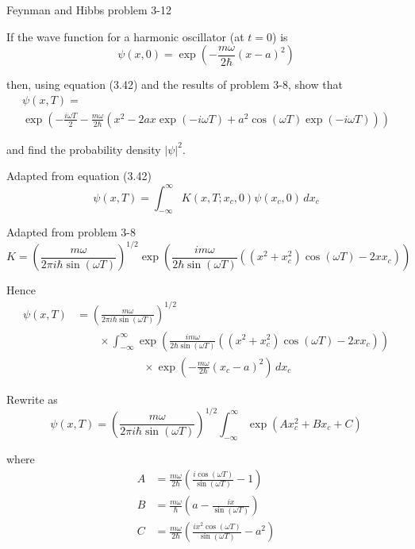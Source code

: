 \documentclass[12pt]{article}
\begin{document}
Feynman and Hibbs problem 3-12

\bigskip
If the wave function for a harmonic oscillator (at $t=0$) is
\begin{equation*}
\psi(x,0)=\exp\left(-\frac{m\omega}{2\hbar}(x-a)^2\right)
\end{equation*}

then, using equation (3.42) and the results of problem 3-8, show that
\begin{multline*}
\psi(x,T)=
\\
\exp\left(
-\frac{i\omega T}{2}-\frac{m\omega}{2\hbar}
\left(x^2-2ax\exp(-i\omega T)+a^2\cos(\omega T)\exp(-i\omega T)\right)
\right)
\end{multline*}

and find the probability density $|\psi|^2$.

\bigskip
Adapted from equation (3.42)
\begin{equation*}
\psi(x,T)=\int_{-\infty}^\infty K(x,T;x_c,0)\psi(x_c,0)\,dx_c
\end{equation*}

Adapted from problem 3-8
\begin{equation*}
K=\left(\frac{m\omega}{2\pi i\hbar\sin(\omega T)}\right)^{1/2}
\exp\left(
\frac{im\omega}{2\hbar\sin(\omega T)}\left((x^2+x_c^2)\cos(\omega T)-2xx_c\right)
\right)
\end{equation*}

Hence
\begin{align*}
\psi(x,T)&=\left(\frac{m\omega}{2\pi i\hbar\sin(\omega T)}\right)^{1/2}
\\
&\qquad{}\times
\int_{-\infty}^\infty \exp\left(
\frac{im\omega}{2\hbar\sin(\omega T)}\left((x^2+x_c^2)\cos(\omega T)-2xx_c\right)
\right)
\\
&\qquad\qquad\qquad{}\times
\exp\left(-\frac{m\omega}{2\hbar}(x_c-a)^2\right)\,dx_c
\end{align*}

Rewrite as
\begin{equation*}
\psi(x,T)=\left(\frac{m\omega}{2\pi i\hbar\sin(\omega T)}\right)^{1/2}
\int_{-\infty}^\infty\exp(Ax_c^2+Bx_c+C)
\end{equation*}

where
\begin{align*}
A&=\frac{m\omega}{2\hbar}\left(\frac{i\cos(\omega T)}{\sin(\omega T)}-1\right)
\tag{1}
\\
B&=\frac{m\omega}{\hbar}\left(a-\frac{ix}{\sin(\omega T)}\right)
\tag{2}
\\
C&=\frac{m\omega}{2\hbar}\left(\frac{ix^2\cos(\omega T)}{\sin(\omega T)}-a^2\right)
\tag{3}
\end{align*}
\end{document}
